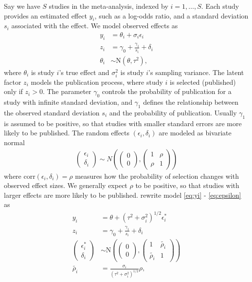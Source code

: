 \documentclass[12pt]{article}   	%
\numberwithin{equation}{section}
\begin{document}
Say we have $S$ studies in the meta-analysis, indexed by $i = 1, \dots, S$. Each study provides an estimated effect $y_i$, such as a log-odds ratio, and a standard deviation $s_i$ associated with the effect. We model observed effects as
\begin{align}
y_i &= \theta_i + \sigma_i \epsilon_i  \label{eq:yi}\\
z_i &= \gamma_0 + \frac{\gamma_1}{s_i} + \delta_i \label{eq:zi}\\
\theta_i & \sim \mbox{N}(\theta, \tau^2), \label{eq:thetai}
\end{align}
where $\theta_i$ is study $i$'s true effect and $\sigma_i^2$ is study $i$'s sampling variance. The latent factor $z_i$ models the publication process, where study $i$ is selected (published) only if $z_i > 0$. The parameter $\gamma_0$ controls the probability of publication for a study with infinite standard deviation, and $\gamma_1$ defines the relationship between the observed standard deviation $s_i$ and the probability of publication. Usually $\gamma_1$ is assumed to be positive, so that studies with smaller standard errors are more likely to be published. The random effects $(\epsilon_i, \delta_i)$ are modeled as bivariate normal
\begin{align}
\begin{pmatrix}
\epsilon_i \\
\delta_i
\end{pmatrix}\sim N\left(\begin{pmatrix}
0 \\
0
\end{pmatrix},\begin{pmatrix}
1 & \rho \\
\rho & 1
\end{pmatrix}\right) \label{eq:epsilon}
\end{align}
where corr$(\epsilon_i, \delta_i) = \rho$ measures how the probability of selection changes with observed effect sizes. We generally expect $\rho$ to be positive, so that studies with larger effects are more likely to be published. \citet{copas2000funnel} rewrite model \eqref{eq:yi} - \eqref{eq:epsilon} as
\begin{align}
y_i &= \theta + (\tau^2 + \sigma_i^2)^{1/2} \epsilon_i^* \\
z_i &= \gamma_0 + \frac{\gamma_1}{s_i} + \delta_i \\
\begin{pmatrix}
\epsilon_i^* \\
\delta_i
\end{pmatrix} & \sim \mbox{N}\left(\begin{pmatrix}
0 \\
0
\end{pmatrix},\begin{pmatrix}
1 & \tilde{\rho_i} \\
\tilde{\rho_i} & 1
\end{pmatrix}\right) \\
\tilde{\rho_i} &= \frac{\sigma_i}{(\tau^2 + \sigma_i^2)^{1/2}} \rho,
\end{align}
\end{document}
